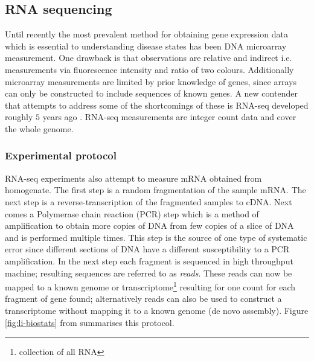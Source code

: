 \subsection{RNA sequencing}
\label{sec:rna-sequencing}

Until recently the most prevalent method for obtaining gene expression data which is essential to understanding disease states has been DNA microarray measurement. One drawback is that observations are relative and indirect i.e. measurements via fluorescence intensity and ratio of two colours. Additionally microarray measurements are limited by prior knowledge of genes, since arrays can only be constructed to include sequences of known genes. A new contender that attempts to address some of the shortcomings of these is RNA-seq developed roughly $5$ years ago \citep{Mortazavi:2008jj, Nagalakshmi:2008cj}. RNA-seq measurements are integer count data and cover the whole genome. 

\subsubsection{Experimental protocol}
\label{sec:technique-bio}

RNA-seq experiments also attempt to measure mRNA obtained from homogenate. The first step is a random fragmentation of the sample mRNA. The next step is a reverse-transcription of the fragmented samples to cDNA. Next comes a Polymerase chain reaction (PCR) step which is a method of amplification to obtain more copies of DNA from few copies of a slice of DNA and is performed multiple times. This step is the source of one type of systematic error since different sections of  DNA have a different susceptibility to a PCR amplification. In the next step each fragment is sequenced in high throughput machine; resulting sequences are referred to as \emph{reads}. These reads can now be mapped to a known genome or transcriptome\footnote{collection of all RNA} resulting for one count for each fragment of gene found;  alternatively reads can also be used to construct a transcriptome without mapping it to a known genome (de novo assembly). Figure \ref{fig:li-biostats} from \cite{Li:2012ea} summarises this protocol. 

